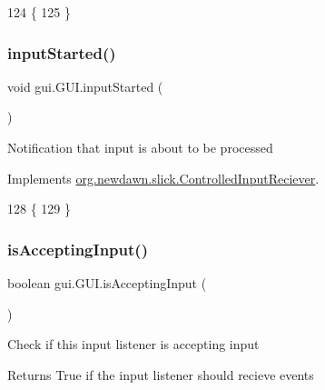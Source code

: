 \begin{DoxyCode}
124                              \{
125     \}
\end{DoxyCode}
\mbox{\label{classgui_1_1_g_u_i_a00cc1291d47fe85ab1dd5ab5c401c0f4}} 
\subsubsection{\texorpdfstring{input\+Started()}{inputStarted()}}
{\footnotesize\ttfamily void gui.\+G\+U\+I.\+input\+Started (\begin{DoxyParamCaption}{ }\end{DoxyParamCaption})\hspace{0.3cm}{\ttfamily [inline]}}

Notification that input is about to be processed 

Implements \mbox{\hyperlink{interfaceorg_1_1newdawn_1_1slick_1_1_controlled_input_reciever_a718de21e9cd22f4c48ee87b5b8b32ed6}{org.\+newdawn.\+slick.\+Controlled\+Input\+Reciever}}.


\begin{DoxyCode}
128                                \{
129     \}
\end{DoxyCode}
\mbox{\label{classgui_1_1_g_u_i_a0d50e235ccee27aa0e35b860cd5dc883}} 
\subsubsection{\texorpdfstring{is\+Accepting\+Input()}{isAcceptingInput()}}
{\footnotesize\ttfamily boolean gui.\+G\+U\+I.\+is\+Accepting\+Input (\begin{DoxyParamCaption}{ }\end{DoxyParamCaption})\hspace{0.3cm}{\ttfamily [inline]}}

Check if this input listener is accepting input

\begin{DoxyReturn}{Returns}
True if the input listener should recieve events 
\end{DoxyReturn}


